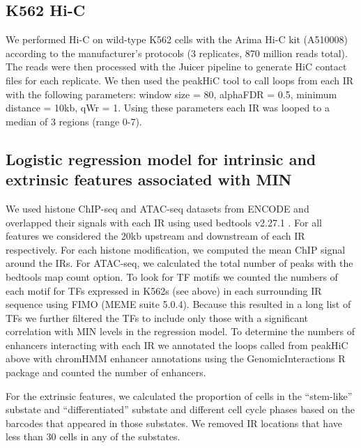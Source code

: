 \subsection*{K562 Hi-C}

We performed Hi-C on wild-type K562 cells with the Arima Hi-C kit (A510008) according to the manufacturer's protocols (3 replicates, 870 million reads total). The reads were then processed with the Juicer pipeline \cite{durandnc_aidenel:JuicerProvides2016} to generate HiC contact files for each replicate. We then used the peakHiC tool \cite{bianchiv_laatw:DetailedRegulatory2019} to call loops from each IR with the following parameters: window size = 80, alphaFDR = 0.5, minimum distance = 10kb, qWr = 1. Using these parameters each IR was looped to a median of 3 regions (range 0-7). 

\subsection*{Logistic regression model for intrinsic and extrinsic features associated with MIN}

We used histone ChIP-seq and ATAC-seq datasets from ENCODE \cite{dunham2012n} and overlapped their signals with each IR using used bedtools v2.27.1 \cite{quinlanar_hallim:BEDToolsFlexible2010}. For all features we considered the 20kb upstream and downstream of each IR respectively. For each histone modification, we computed the mean ChIP signal around the IRs. For ATAC-seq, we calculated the total number of peaks with the bedtools map count option. To look for TF motifs we counted the numbers of each motif for TFs expressed in K562s (see above) in each surrounding IR sequence using FIMO \cite{grantce_noblews:FIMOScanning2011} (MEME suite 5.0.4). Because this resulted in a long list of TFs we further filtered the TFs to include only those with a significant correlation with MIN levels in the regression model. To determine the numbers of enhancers interacting with each IR we annotated the loops called from peakHiC above with chromHMM enhancer annotations using the GenomicInteractions R package \cite{harmstonn_lenhardb:GenomicInteractionsBioconductor2015} and counted the number of enhancers. 

For the extrinsic features, we calculated the proportion of cells in the \enquote{stem-like} substate and \enquote{differentiated} substate and different cell cycle phases based on the barcodes that appeared in those substates. We removed IR locations that have less than 30 cells in any of the substates.  

